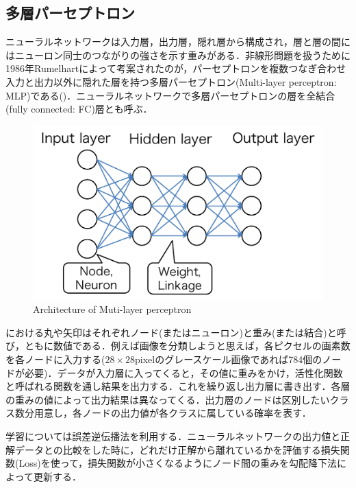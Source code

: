 \subsection{多層パーセプトロン}
ニューラルネットワークは入力層，出力層，隠れ層から構成され，層と層の間にはニューロン同士のつながりの強さを示す重みがある．非線形問題を扱うために1986年Rumelhartによって考案されたのが，パーセプトロンを複数つなぎ合わせ入力と出力以外に隠れた層を持つ多層パーセプトロン(Multi-layer perceptron: MLP)である()．ニューラルネットワークで多層パーセプトロンの層を全結合(fully connected: FC)層とも呼ぶ．
\begin{figure}
	\centering
	\includegraphics[width=0.7\linewidth]{fig/MLP}
	\caption{Architecture of Muti-layer perceptron}
	\label{fig:mlp}
\end{figure}
における丸や矢印はそれぞれノード(またはニューロン)と重み(または結合)と呼び，ともに数値である．例えば画像を分類しようと思えば，各ピクセルの画素数を各ノードに入力する($28 \times 28$pixelのグレースケール画像であれば784個のノードが必要)．データが入力層に入ってくると，その値に重みをかけ，活性化関数と呼ばれる関数を通し結果を出力する．これを繰り返し出力層に書き出す．各層の重みの値によって出力結果は異なってくる．出力層のノードは区別したいクラス数分用意し，各ノードの出力値が各クラスに属している確率を表す．

学習については誤差逆伝播法を利用する．ニューラルネットワークの出力値と正解データとの比較をした時に，どれだけ正解から離れているかを評価する損失関数(Loss)を使って，損失関数が小さくなるようにノード間の重みを勾配降下法によって更新する．


